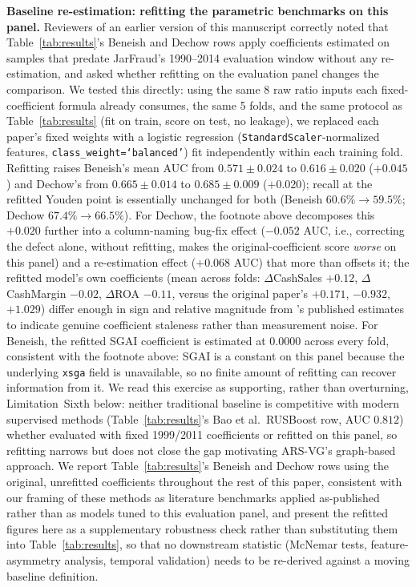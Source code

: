 \documentclass[12pt]{article}
\begin{document}
\textbf{Baseline re-estimation: refitting the parametric benchmarks on
this panel.} Reviewers of an earlier version of this manuscript correctly
noted that Table~\ref{tab:results}'s Beneish and Dechow rows apply
coefficients estimated on samples that predate JarFraud's 1990--2014
evaluation window without any re-estimation, and asked whether refitting
on the evaluation panel changes the comparison.  We tested this directly:
using the same 8 raw ratio inputs each fixed-coefficient formula already
consumes, the same 5 folds, and the same protocol as Table~\ref{tab:results}
(fit on train, score on test, no leakage), we replaced each paper's fixed
weights with a logistic regression (\texttt{StandardScaler}-normalized
features, \texttt{class\_weight=`balanced'}) fit independently within each
training fold.  Refitting raises Beneish's mean AUC from
$0.571\pm0.024$ to $0.616\pm0.020$ ($+0.045$) and Dechow's from
$0.665\pm0.014$ to $0.685\pm0.009$ ($+0.020$); recall at the
refitted Youden point is essentially unchanged for both (Beneish
$60.6\%\rightarrow59.5\%$; Dechow $67.4\%\rightarrow66.5\%$).  For
Dechow, the footnote above decomposes this $+0.020$ further into a
column-naming bug-fix effect ($-0.052$ AUC, i.e., correcting the defect
alone, without refitting, makes the original-coefficient score \emph{worse}
on this panel) and a re-estimation effect ($+0.068$ AUC) that more than
offsets it; the refitted model's own coefficients (mean across folds:
$\Delta$CashSales $+0.12$, $\Delta$CashMargin $-0.02$, $\Delta$ROA $-0.11$,
versus the original paper's $+0.171$, $-0.932$, $+1.029$) differ enough in
sign and relative magnitude from \citet{dechow2011}'s published estimates
to indicate genuine coefficient staleness rather than measurement noise.
For Beneish, the refitted SGAI coefficient is estimated at $0.0000$ across
every fold, consistent with the footnote above: SGAI is a constant on this
panel because the underlying \texttt{xsga} field is unavailable, so no
finite amount of refitting can recover information from it.  We read this
exercise as supporting, rather than overturning, Limitation~Sixth below:
neither traditional baseline is competitive with modern
supervised methods (Table~\ref{tab:results}'s Bao et al.\ RUSBoost row,
AUC $0.812$) whether evaluated with fixed 1999/2011 coefficients or
refitted on this panel, so refitting narrows but does not close the gap
motivating ARS-VG's graph-based approach.  We report
Table~\ref{tab:results}'s Beneish and Dechow rows using the original,
unrefitted coefficients throughout the rest of this paper, consistent
with our framing of these methods as literature benchmarks applied
as-published rather than as models tuned to this evaluation panel, and
present the refitted figures here as a supplementary robustness check
rather than substituting them into Table~\ref{tab:results}, so that no
downstream statistic (McNemar tests, feature-asymmetry analysis, temporal
validation) needs to be re-derived against a moving baseline definition.
\end{document}
